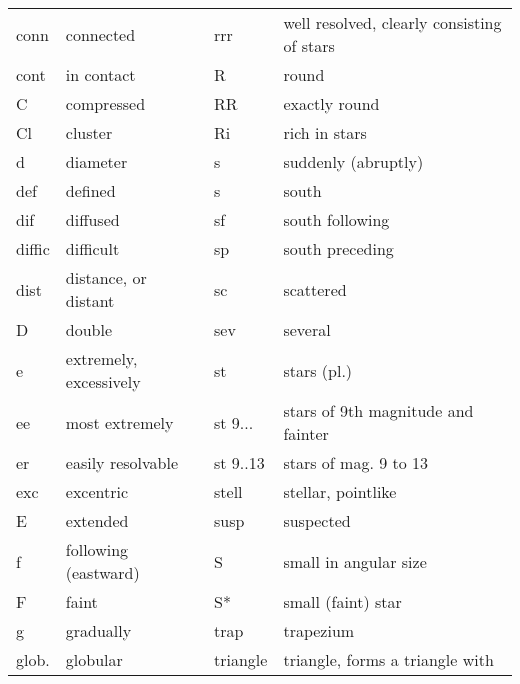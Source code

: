 \begin{tabular}{ll|ll}
conn   & connected                  & rrr      & well resolved, clearly consisting of stars    \\
cont   & in contact                 & R        & round                                         \\
C      & compressed                 & RR       & exactly round                                 \\
Cl     & cluster                    & Ri       & rich in stars                                 \\
d      & diameter                   & s        & suddenly (abruptly)                           \\
def    & defined                    & s        & south                                         \\
dif    & diffused                   & sf       & south following                               \\
diffic & difficult                  & sp       & south preceding                               \\
dist   & distance, or distant       & sc       & scattered                                     \\
D      & double                     & sev      & several                                       \\
e      & extremely, excessively     & st       & stars (pl.)                                   \\
ee     & most extremely             & st 9...  & stars of 9th magnitude and fainter            \\
er     & easily resolvable          & st 9..13 & stars of mag. 9 to 13                         \\
exc    & excentric                  & stell    & stellar, pointlike                            \\
E      & extended                   & susp     & suspected                                     \\
f      & following (eastward)       & S        & small in angular size                         \\
F      & faint                      & S*       & small (faint) star                            \\
g      & gradually                  & trap     & trapezium                                     \\
glob.  & globular                   & triangle & triangle, forms a triangle with               \\

\end{tabular}
